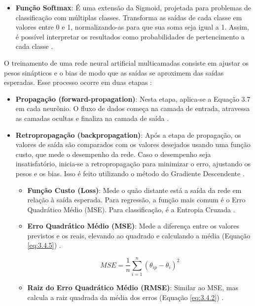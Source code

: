 \begin{itemize}
    \item \textbf{Função Softmax}: É uma extensão da Sigmoid, projetada para problemas de classificação com múltiplas classes. Transforma as saídas de cada classe em valores entre 0 e 1, normalizando-as para que sua soma seja igual a 1. Assim, é possível interpretar os resultados como probabilidades de pertencimento a cada classe \cite{sensoy2018}.
\end{itemize}

O treinamento de uma rede neural artificial multicamadas consiste em ajustar os pesos sinápticos e o bias de modo que as saídas se aproximem das saídas esperadas. Esse processo ocorre em duas etapas \cite{russel2010}:

\begin{itemize}
    \item \textbf{Propagação (forward-propagation)}: Nesta etapa, aplica-se a Equação 3.7 em cada neurônio. O fluxo de dados começa na camada de entrada, atravessa as camadas ocultas e finaliza na camada de saída \cite{hafemann2014}.
    
    \item \textbf{Retropropagação (backpropagation)}: Após a etapa de propagação, os valores de saída são comparados com os valores desejados usando uma função custo, que mede o desempenho da rede. Caso o desempenho seja insatisfatório, inicia-se a retropropagação para minimizar o erro, ajustando os pesos e os bias. Isso é feito utilizando o método do Gradiente Descendente \cite{hafemann2014}.
    
    \begin{itemize}
        \item \textbf{Função Custo (Loss)}: Mede o quão distante está a saída da rede em relação à saída esperada. Para regressão, a função mais comum é o Erro Quadrático Médio (MSE). Para classificação, é a Entropia Cruzada \cite{mccaffrey2013}.
        
        \item \textbf{Erro Quadrático Médio (MSE)}: Mede a diferença entre os valores previstos e os reais, elevando ao quadrado e calculando a média (Equação \ref{eq:3.4.5}) \cite{willmott1981}.

            \begin{equation}
                MSE = \frac{1}{n} \sum_{i=1}^{n} (\theta_{ip} - \theta_{i})^2 
                \label{eq:3.4.5}
            \end{equation}
        
        \item \textbf{Raiz do Erro Quadrático Médio (RMSE)}: Similar ao MSE, mas calcula a raiz quadrada da média dos erros (Equação \ref{eq:3.4.2}) \cite{chai2014}.


\end{itemize}
\end{itemize}
